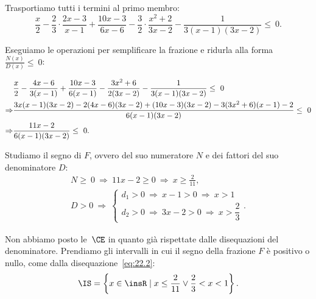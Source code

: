 \begin{exrig}
\begin{esempio}
Trasportiamo tutti i termini al primo membro:
\[\frac{x}{2}-\frac{2}{3}\cdot\frac{2x-3}{x-1}+\frac{10x-3}{6x-6}-\frac{3}{2}\cdot\frac{x^{2}+2}{3x-2}-\frac{1}{3(x-1)(3x-2)}\le~0.\]

Eseguiamo le operazioni per semplificare la frazione e ridurla alla
forma~$\frac{N(x)}{D(x)}\le~0$:

\begin{align}
  &\frac{x}{2}-\frac{4x-6}{3(x-1)}+\frac{10x-3}{6(x-1)}-\frac{3x^{2}+6}{2(3x-2)}-\frac{1}{3(x-1)(3x-2)}\le~0\notag\\
  \Rightarrow &\frac{3x(x-1)(3x-2)-2(4x-6)(3x-2)+(10x-3)(3x-2)-3(3x^{2}+6)(x-1)-2}{6(x-1)(3x-2)}\le~0\notag\\
  \Rightarrow &\frac{11x-2}{6(x-1)(3x-2)}\le~0. \label{eq:22.2}
\end{align}

Studiamo il segno di $F$, ovvero del suo numeratore $N$ e dei fattori del suo denominatore $D$:
 \[\begin{gathered}N\ge~0\:\Rightarrow\: 11x-2\ge 0\:\Rightarrow\: x\ge\frac{2}{11}\text{,}\\
		  D>0\:\Rightarrow\:\left\{\begin{array}{l}
			d_{1}>0\:\Rightarrow\: x-1>0\:\Rightarrow\: x>1\\
			d_{2}>0\:\Rightarrow\: 3x-2>0\:\Rightarrow\: x>\dfrac{2}{3}
			\end{array}\right.. \end{gathered}\]
\begin{center}

\end{center}
Non abbiamo posto le~$\CE$ in quanto già rispettate dalle disequazioni
del denominatore. Prendiamo gli intervalli in cui il segno della frazione $F$ è positivo o
nullo, come dalla disequazione~\ref{eq:22.2}:
\[\IS=\left\{x\in \insR\mid x\le\frac{2}{11}\vee \frac{2}{3}<x<1\right\}.\]
 \end{esempio}
\end{exrig}
\ovalbox{\risolvii \ref{ese:21.54}, \ref{ese:21.55}, \ref{ese:21.56}, \ref{ese:21.57}, \ref{ese:21.58}, \ref{ese:21.59}, \ref{ese:21.60}, \ref{ese:21.61}, \ref{ese:21.62}, \ref{ese:21.63}}

\vspazio\ovalbox{\ref{ese:21.64}, \ref{ese:21.65}, \ref{ese:21.66}, \ref{ese:21.67}, \ref{ese:21.68}, \ref{ese:21.69}}
\newpage

\cleardoublepage
